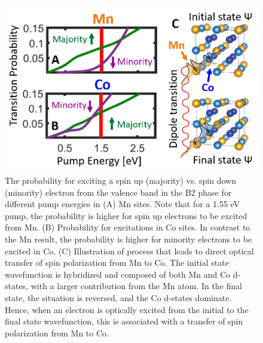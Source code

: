 \begin{figure}
	\label{fig: Heus4}
	\begin{center}
		\includegraphics[width=150mm]{figs/Heus4}
	\end{center}
	\caption{The probability for exciting a spin up (majority) vs. spin down (minority) electron from the valence band in the B2 phase for different pump energies in (A) Mn sites. Note that for a 1.55 eV pump, the probability is higher for spin up electrons to be excited from Mn. (B) Probability for excitations in Co sites. In contrast to the Mn result, the probability is higher for minority electrons to be excited in Co. (C) Illustration of process that leads to direct optical transfer of spin polarization from Mn to Co. The initial state wavefunction is hybridized and composed of both Mn and Co d-states, with a larger contribution from the Mn atom. In the final state, the situation is reversed, and the Co d-states dominate. Hence, when an electron is optically excited from the initial to the final state wavefunction, this is associated with a transfer of spin polarization from Mn to Co. }
\end{figure}

